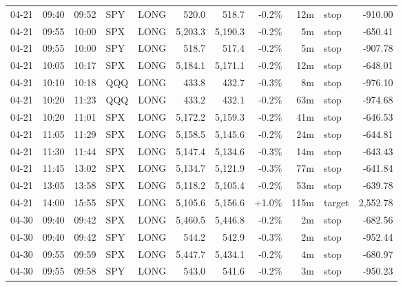 \documentclass[11pt,a4paper,twoside]{article}
\begin{document}
\begin{center}
\begin{longtable}{>{\color{txtmain}}l l l l l r r r r >{\color{txtmain}}l r}
04-21 & 09:40 & 09:52 & SPY & LONG & 520.0 & 518.7 & \textcolor{lossred}{-0.2\%} & 12m & stop & \textcolor{lossred}{-910.00} \\
04-21 & 09:55 & 10:00 & SPX & LONG & 5,203.3 & 5,190.3 & \textcolor{lossred}{-0.2\%} & 5m & stop & \textcolor{lossred}{-650.41} \\
04-21 & 09:55 & 10:00 & SPY & LONG & 518.7 & 517.4 & \textcolor{lossred}{-0.2\%} & 5m & stop & \textcolor{lossred}{-907.78} \\
04-21 & 10:05 & 10:17 & SPX & LONG & 5,184.1 & 5,171.1 & \textcolor{lossred}{-0.2\%} & 12m & stop & \textcolor{lossred}{-648.01} \\
04-21 & 10:10 & 10:18 & QQQ & LONG & 433.8 & 432.7 & \textcolor{lossred}{-0.3\%} & 8m & stop & \textcolor{lossred}{-976.10} \\
04-21 & 10:20 & 11:23 & QQQ & LONG & 433.2 & 432.1 & \textcolor{lossred}{-0.2\%} & 63m & stop & \textcolor{lossred}{-974.68} \\
04-21 & 10:20 & 11:01 & SPX & LONG & 5,172.2 & 5,159.3 & \textcolor{lossred}{-0.2\%} & 41m & stop & \textcolor{lossred}{-646.53} \\
04-21 & 11:05 & 11:29 & SPX & LONG & 5,158.5 & 5,145.6 & \textcolor{lossred}{-0.2\%} & 24m & stop & \textcolor{lossred}{-644.81} \\
04-21 & 11:30 & 11:44 & SPX & LONG & 5,147.4 & 5,134.6 & \textcolor{lossred}{-0.3\%} & 14m & stop & \textcolor{lossred}{-643.43} \\
04-21 & 11:45 & 13:02 & SPX & LONG & 5,134.7 & 5,121.9 & \textcolor{lossred}{-0.3\%} & 77m & stop & \textcolor{lossred}{-641.84} \\
04-21 & 13:05 & 13:58 & SPX & LONG & 5,118.2 & 5,105.4 & \textcolor{lossred}{-0.2\%} & 53m & stop & \textcolor{lossred}{-639.78} \\
04-21 & 14:00 & 15:55 & SPX & LONG & 5,105.6 & 5,156.6 & \textcolor{wingreen}{+1.0\%} & 115m & target & \textcolor{wingreen}{2,552.78} \\
04-30 & 09:40 & 09:42 & SPX & LONG & 5,460.5 & 5,446.8 & \textcolor{lossred}{-0.2\%} & 2m & stop & \textcolor{lossred}{-682.56} \\
04-30 & 09:40 & 09:42 & SPY & LONG & 544.2 & 542.9 & \textcolor{lossred}{-0.3\%} & 2m & stop & \textcolor{lossred}{-952.44} \\
04-30 & 09:55 & 09:59 & SPX & LONG & 5,447.7 & 5,434.1 & \textcolor{lossred}{-0.2\%} & 4m & stop & \textcolor{lossred}{-680.97} \\
04-30 & 09:55 & 09:58 & SPY & LONG & 543.0 & 541.6 & \textcolor{lossred}{-0.2\%} & 3m & stop & \textcolor{lossred}{-950.23} \\

\end{longtable}
\end{center}
\end{document}
